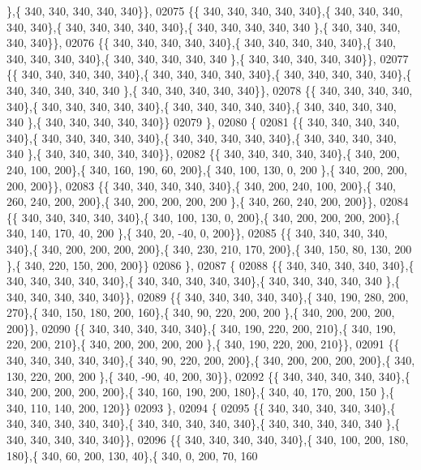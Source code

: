 \begin{DoxyCode}
      \},\{ 340, 340, 340, 340, 340\}\},
02075 \{\{ 340, 340, 340, 340, 340\},\{ 340, 340, 340, 340, 340\},\{ 340, 340, 340, 340, 340\},\{ 340, 340, 340, 340, 340
      \},\{ 340, 340, 340, 340, 340\}\},
02076 \{\{ 340, 340, 340, 340, 340\},\{ 340, 340, 340, 340, 340\},\{ 340, 340, 340, 340, 340\},\{ 340, 340, 340, 340, 340
      \},\{ 340, 340, 340, 340, 340\}\},
02077 \{\{ 340, 340, 340, 340, 340\},\{ 340, 340, 340, 340, 340\},\{ 340, 340, 340, 340, 340\},\{ 340, 340, 340, 340, 340
      \},\{ 340, 340, 340, 340, 340\}\},
02078 \{\{ 340, 340, 340, 340, 340\},\{ 340, 340, 340, 340, 340\},\{ 340, 340, 340, 340, 340\},\{ 340, 340, 340, 340, 340
      \},\{ 340, 340, 340, 340, 340\}\}
02079 \},
02080 \{
02081 \{\{ 340, 340, 340, 340, 340\},\{ 340, 340, 340, 340, 340\},\{ 340, 340, 340, 340, 340\},\{ 340, 340, 340, 340, 340
      \},\{ 340, 340, 340, 340, 340\}\},
02082 \{\{ 340, 340, 340, 340, 340\},\{ 340, 200, 240, 100, 200\},\{ 340, 160, 190,  60, 200\},\{ 340, 100, 130,   0, 200
      \},\{ 340, 200, 200, 200, 200\}\},
02083 \{\{ 340, 340, 340, 340, 340\},\{ 340, 200, 240, 100, 200\},\{ 340, 260, 240, 200, 200\},\{ 340, 200, 200, 200, 200
      \},\{ 340, 260, 240, 200, 200\}\},
02084 \{\{ 340, 340, 340, 340, 340\},\{ 340, 100, 130,   0, 200\},\{ 340, 200, 200, 200, 200\},\{ 340, 140, 170,  40, 200
      \},\{ 340,  20, -40,   0, 200\}\},
02085 \{\{ 340, 340, 340, 340, 340\},\{ 340, 200, 200, 200, 200\},\{ 340, 230, 210, 170, 200\},\{ 340, 150,  80, 130, 200
      \},\{ 340, 220, 150, 200, 200\}\}
02086 \},
02087 \{
02088 \{\{ 340, 340, 340, 340, 340\},\{ 340, 340, 340, 340, 340\},\{ 340, 340, 340, 340, 340\},\{ 340, 340, 340, 340, 340
      \},\{ 340, 340, 340, 340, 340\}\},
02089 \{\{ 340, 340, 340, 340, 340\},\{ 340, 190, 280, 200, 270\},\{ 340, 150, 180, 200, 160\},\{ 340,  90, 220, 200, 200
      \},\{ 340, 200, 200, 200, 200\}\},
02090 \{\{ 340, 340, 340, 340, 340\},\{ 340, 190, 220, 200, 210\},\{ 340, 190, 220, 200, 210\},\{ 340, 200, 200, 200, 200
      \},\{ 340, 190, 220, 200, 210\}\},
02091 \{\{ 340, 340, 340, 340, 340\},\{ 340,  90, 220, 200, 200\},\{ 340, 200, 200, 200, 200\},\{ 340, 130, 220, 200, 200
      \},\{ 340, -90,  40, 200,  30\}\},
02092 \{\{ 340, 340, 340, 340, 340\},\{ 340, 200, 200, 200, 200\},\{ 340, 160, 190, 200, 180\},\{ 340,  40, 170, 200, 150
      \},\{ 340, 110, 140, 200, 120\}\}
02093 \},
02094 \{
02095 \{\{ 340, 340, 340, 340, 340\},\{ 340, 340, 340, 340, 340\},\{ 340, 340, 340, 340, 340\},\{ 340, 340, 340, 340, 340
      \},\{ 340, 340, 340, 340, 340\}\},
02096 \{\{ 340, 340, 340, 340, 340\},\{ 340, 100, 200, 180, 180\},\{ 340,  60, 200, 130,  40\},\{ 340,   0, 200,  70, 160

\end{DoxyCode}
